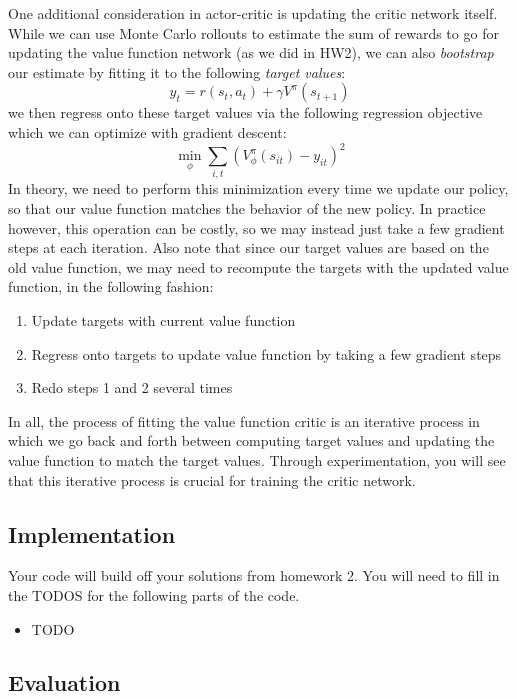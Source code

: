 \documentclass{article}
\begin{document}
One additional consideration in actor-critic is updating the critic network itself. While we can use Monte Carlo rollouts to estimate the sum of rewards to go for updating the value function network (as we did in HW2), we can also \textit{bootstrap} our estimate by fitting it to the following \textit{target values}:
$$y_t = r(s_t, a_t) + \gamma V^\pi(s_{t+1})$$
we then regress onto these target values via the following regression objective which we can optimize with gradient descent:
$$\min_{\phi} \sum_{i,t} (V_{\phi}^\pi(s_{it}) - y_{it})^2$$
In theory, we need to perform this minimization every time we update our policy, so that our value function matches the behavior of the new policy. In practice however, this operation can be costly, so we may instead just take a few gradient steps at each iteration. Also note that since our target values are based on the old value function, we may need to recompute the targets with the updated value function, in the following fashion:
\begin{enumerate}
    \item Update targets with current value function
    \item Regress onto targets to update value function by taking a few gradient steps
    \item Redo steps 1 and 2 several times
\end{enumerate}
In all, the process of fitting the value function critic is an iterative process in which we go back and forth between computing target values and updating the value function to match the target values. Through experimentation, you will see that this iterative process is crucial for training the critic network.

\subsection{Implementation}

Your code will build off your solutions from homework 2. You will need to fill in the TODOS for the following parts of the code.

\begin{itemize}
    \item {\color{red} TODO}
\end{itemize}
 
\subsection{Evaluation}
\end{document}
